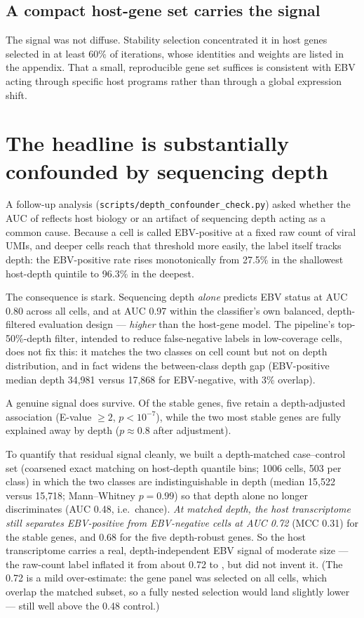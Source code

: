 \documentclass[11pt]{article}
\begin{document}
\subsection{A compact host-gene set carries the signal}
The signal was not diffuse. Stability selection concentrated it in
 host genes selected in at least 60\% of iterations,
whose identities and weights are listed in the appendix. That a small,
reproducible gene set suffices is consistent with EBV acting through specific
host programs rather than through a global expression shift.

\section{The headline is substantially confounded by sequencing depth}
\label{sec:depth}
A follow-up analysis (\texttt{scripts/depth\_confounder\_check.py}) asked whether the
AUC of  reflects host biology or an artifact of sequencing
depth acting as a common cause. Because a cell is called EBV-positive at a fixed
raw count of  viral UMIs, and deeper cells reach
that threshold more easily, the label itself tracks depth: the EBV-positive rate
rises monotonically from 27.5\% in the shallowest host-depth quintile to 96.3\% in
the deepest.

The consequence is stark. Sequencing depth \emph{alone} predicts EBV status at
AUC 0.80 across all cells, and at AUC 0.97 within the classifier's own
balanced, depth-filtered evaluation design --- \emph{higher} than the
 host-gene model. The pipeline's top-50\%-depth filter,
intended to reduce false-negative labels in low-coverage cells, does not fix this:
it matches the two classes on cell count but not on depth distribution, and in fact
widens the between-class depth gap (EBV-positive median depth 34{,}981 versus
17{,}868 for EBV-negative, with 3\% overlap).

A genuine signal does survive. Of the  stable genes, five
retain a depth-adjusted association (E-value $\geq 2$, $p<10^{-7}$), while the two
most stable genes are fully explained away by depth ($p\approx 0.8$ after
adjustment).

To quantify that residual signal cleanly, we built a depth-matched case--control set
(coarsened exact matching on host-depth quantile bins; 1006 cells, 503 per class) in
which the two classes are indistinguishable in depth (median 15{,}522 versus 15{,}718;
Mann--Whitney $p=0.99$) so that depth alone no longer discriminates (AUC 0.48, i.e.\
chance). \emph{At matched depth, the host transcriptome still separates EBV-positive
from EBV-negative cells at AUC 0.72} (MCC 0.31) for the \SciVal{\NStableGenes}{15}
stable genes, and 0.68 for the five depth-robust genes. So the host transcriptome
carries a real, depth-independent EBV signal of moderate size --- the raw-count label
inflated it from about 0.72 to \SciVal{\AUCMean}{0.866}, but did not invent it. (The
0.72 is a mild over-estimate: the gene panel was selected on all cells, which overlap
the matched subset, so a fully nested selection would land slightly lower --- still well
above the 0.48 control.)
\end{document}

